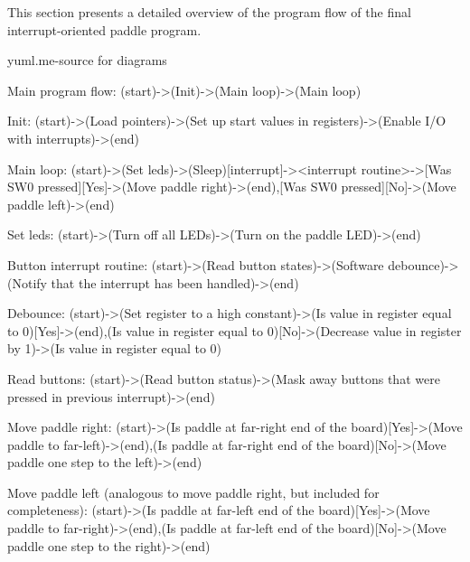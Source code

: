 This section presents a detailed overview of the program flow of the final interrupt-oriented paddle program.


yuml.me-source for diagrams

Main program flow:
(start)->(Init)->(Main loop)->(Main loop)


Init:
(start)->(Load pointers)->(Set up start values in registers)->(Enable I/O with interrupts)->(end)

Main loop:
(start)->(Set leds)->(Sleep)[interrupt]-><interrupt routine>->[Was SW0 pressed][Yes]->(Move paddle right)->(end),[Was SW0 pressed][No]->(Move paddle left)->(end)


Set leds:
(start)->(Turn off all LEDs)->(Turn on the paddle LED)->(end)

Button interrupt routine:
(start)->(Read button states)->(Software debounce)->(Notify that the interrupt has been handled)->(end)

Debounce:
(start)->(Set register to a high constant)->(Is value in register equal to 0)[Yes]->(end),(Is value in register equal to 0)[No]->(Decrease value in register by 1)->(Is value in register equal to 0)

Read buttons:
(start)->(Read button status)->(Mask away buttons that were pressed in previous interrupt)->(end)

Move paddle right:
(start)->(Is paddle at far-right end of the board)[Yes]->(Move paddle to far-left)->(end),(Is paddle at far-right end of the board)[No]->(Move paddle one step to the left)->(end)

Move paddle left (analogous to move paddle right, but included for completeness):
(start)->(Is paddle at far-left end of the board)[Yes]->(Move paddle to far-right)->(end),(Is paddle at far-left end of the board)[No]->(Move paddle one step to the right)->(end)

